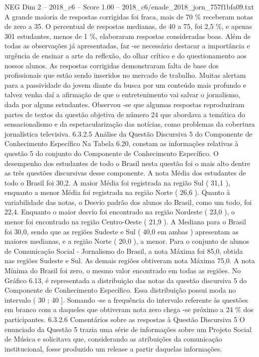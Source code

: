 \begin{textsample}{NEG Dim 2 – 2018\_c6 – Score 1.00 – 2018\_c6/enade\_2018\_jorn\_757f1bfa09.txt}
A grande maioria de respostas corrigidas foi fraca, mais de 70 \% receberam notas de zero a 35.
O percentual de respostas medianas, de 40 a 75, foi 2,5 \%, e apenas 301 estudantes, menos de 1 \%, elaboraram respostas consideradas boas.
Além de todas as observações já apresentadas, faz -se necessário destacar a importância e urgência de ensinar a arte da reflexão, do olhar crítico e do questionamento aos nossos alunos.
As respostas corrigidas demonstraram falta de base dos profissionais que estão sendo inseridos no mercado de trabalho.
Muitas alertam para a passividade do jovem diante da busca por um conteúdo mais profundo e talvez venha daí a afirmação de que o entretenimento vai salvar o jornalismo, dada por alguns estudantes.
Observou -se que algumas respostas reproduziram partes de textos da questão objetiva de número 24 que abordava a temática do sensacionalismo e da espetacularização das notícias, como problemas da cobertura jornalística televisiva. 6.3.2.5 Análise da Questão Discursiva 5 do Componente de Conhecimento Específico Na Tabela 6.20, constam as informações relativas à questão 5 do conjunto do Componente de Conhecimento Específico.
O desempenho dos estudantes de todo o Brasil nesta questão foi o mais alto dentre as três questões discursivas desse componente.
A nota Média dos estudantes de todo o Brasil foi 30,2.
A maior Média foi registrada na região Sul ( 31,1 ), enquanto a menor Média foi registrada na região Norte ( 26,6 ).
Quanto à variabilidade das notas, o Desvio padrão dos alunos do Brasil, como um todo, foi 22,4.
Enquanto o maior desvio foi encontrado na região Nordeste ( 23,0 ), o menor foi encontrado na região Centro-Oeste ( 21,9 ).
A Mediana para o Brasil foi 30,0, sendo que as regiões Sudeste e Sul ( 40,0 em ambas ) apresentam as maiores medianas, e a região Norte ( 20,0 ), a menor.
Para o conjunto de alunos de Comunicação Social - Jornalismo do Brasil, a nota Máxima foi 85,0, obtida nas regiões Sudeste e Sul.
As demais regiões obtiveram nota Máxima 75,0.
A nota Mínima do Brasil foi zero, o mesmo valor encontrado em todas as regiões.
No Gráfico 6.13, é representada a distribuição das notas da questão discursiva 5 do Componente de Conhecimento Específico.
Essa distribuição possui moda no intervalo ( 30 ; 40 ].
Somando -se a frequência do intervalo referente às questões em branco com a daqueles que obtiveram nota zero chega -se próximo a 24 \% dos participantes. 6.3.2.6 Comentários sobre as respostas à Questão Discursiva 5 O enunciado da Questão 5 trazia uma série de informações sobre um Projeto Social de Música e solicitava que, considerando as atribuições da comunicação institucional, fosse produzido um release a partir daquelas informações.

\end{textsample}
